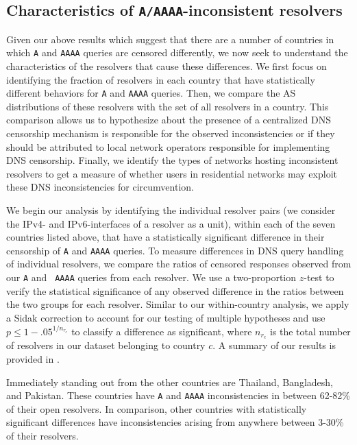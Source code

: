 \subsection{Characteristics of {\tt A/AAAA}-inconsistent resolvers}
\label{sec:resources:resolvers}
Given our above results which suggest that there are a number of countries in
which {\tt A} and {\tt AAAA} queries are censored differently, we now seek to
understand the characteristics of the resolvers that cause these differences.
%
We first focus on identifying the fraction of resolvers in each country that
have statistically different behaviors for {\tt A} and {\tt AAAA} queries.
Then, we compare the AS distributions of these resolvers with the set of all
resolvers in a country. This comparison allows us to hypothesize about the
presence of a centralized DNS censorship mechanism is responsible for the
observed inconsistencies or if they should be attributed to local network
operators responsible for implementing DNS censorship. Finally, we identify the
types of networks hosting inconsistent resolvers to get a measure of whether
users in residential networks may exploit these DNS inconsistencies for
circumvention.

%
We begin our analysis by identifying the individual resolver pairs (\ie we
consider the IPv4- and IPv6-interfaces of a resolver as a unit), within each
of the seven countries listed above, that have a statistically significant
difference in their censorship of {\tt A} and {\tt AAAA} queries.
%
To measure differences in DNS query handling of individual resolvers, we
compare the ratios of censored responses observed from our {\tt A} and {\tt
AAAA} queries {from each resolver}.  
%
We use a two-proportion $z$-test to verify the statistical significance of any
observed difference in the ratios between the two groups for each resolver.
Similar to our within-country analysis, we apply a Sidak correction to account
for our testing of multiple hypotheses and use $p \leq 1-{.05}^{1/n_{r_c}}$ to
classify a difference as significant, where $n_{r_c}$ is the total number of
resolvers in our dataset belonging to country $c$.
%
A summary of our results is provided in . 

%
Immediately standing out from the other countries are Thailand, Bangladesh, and
Pakistan. These countries have {\tt A} and {\tt AAAA} inconsistencies in
between 62-82\% of their open resolvers. In comparison, other countries with
statistically significant differences have inconsistencies arising from
anywhere between 3-30\% of their resolvers. 
%

